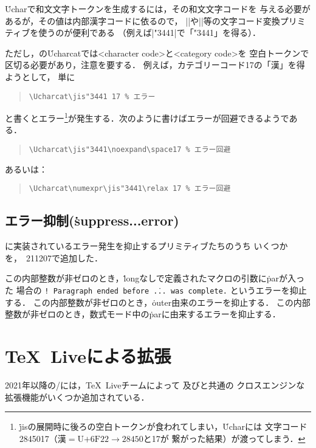 \documentclass[a4paper,11pt,nomag,dvipdfmx]{jsarticle}
\begin{document}
\begin{dangerous}
  \.{Uchar}で和文文字トークンを生成するには，その和文文字コードを
  与える必要があるが，その値は内部漢字コードに依るので，
  |\jis|や|\euc|等の文字コード変換プリミティブを使うのが便利である
  （例えば|\Uchar\jis"3441|で「\Uchar\jis"3441」を得る）．

  ただし，\eupTeX の\.{Ucharcat}では<character code>と<category code>を
  空白トークンで区切る必要があり，注意を要する．
  例えば，カテゴリーコード17の「漢」を得ようとして，
  単に
  \begin{quote}
	\verb+\Ucharcat\jis"3441 17 % エラー+
  \end{quote}
  と書くとエラー\footnote{%
    \.{jis}の展開時に後ろの空白トークンが食われてしまい，\.{Uchar}には
    文字コード2845017（$\text{漢}=\text{U+6F22}\rightarrow 28450$と17が
    繋がった結果）が渡ってしまう．
  }が発生する．次のように書けばエラーが回避できるようである．
  \begin{quote}
	\verb+\Ucharcat\jis"3441\noexpand\space17 % エラー回避+
  \end{quote}
  あるいは：
  \begin{quote}
	\verb+\Ucharcat\numexpr\jis"3441\relax 17 % エラー回避+
  \end{quote}
\end{dangerous}


\subsection{エラー抑制(\.{suppress...error})}
に実装されているエラー発生を抑止するプリミティブたちのうち
いくつかを，\epTeX~211207で追加した．
\begin{cslist}
  この内部整数が非ゼロのとき，\.{long}なしで定義されたマクロの引数に\.{par}が入った
  場合の \texttt{! Paragraph ended before \.{...} was complete.} というエラーを抑止する．
  この内部整数が非ゼロのとき，\.{outer}由来のエラーを抑止する．
  この内部整数が非ゼロのとき，数式モード中の\.{par}に由来するエラーを抑止する．
\end{cslist}


\section{\TeX~Liveによる拡張}
2021年以降の\epTeX/\eupTeX には，\TeX~Liveチームによって
及びと共通の
クロスエンジンな拡張機能がいくつか追加されている．
\end{document}
